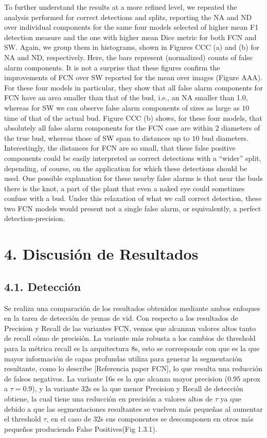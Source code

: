 \documentclass[a4paper,authoryear,review]{elsarticle}
\begin{document}
To further understand the results at a more refined level, we repeated the analysis performed for correct detections and splits, reporting the NA and ND over individual components for the same four models selected of higher mean F1 detection measure and the one with higher mean Dice metric for both FCN and SW. Again, we group them in histograms, shown in Figures CCC (a) and (b) for NA and ND, respectively. Here, the bars represent (normalized) counts of false alarm components. It is not a surprise that these figures confirm the improvements of FCN over SW reported for the mean over images (Figure AAA). For these four models in particular, they show that all false alarm components for FCN have an area smaller than that of the bud, i.e., an NA smaller than 1.0, whereas for SW we can observe false alarm components of sizes as large as $10$ time of that of the actual bud. Figure CCC (b) shows, for these four models, that absolutely all false alarm components for the FCN case are within $2$ diameters of the true bud, whereas those of SW span to distances up to $10$ bud diameters. Interestingly, the distances for FCN are so small, that these false positive components could be easily interpreted as correct detections with a “wider” split, depending, of course, on the application for which these detections should be used.   One possible explanation for these nearby false alarms is that near the buds there is the knot, a part of the plant that even a naked eye could sometimes confuse with a bud. Under this relaxation of what we call correct detection, these two FCN models would present not a single false alarm, or equivalently, a perfect detection-precision.

\section{4. Discusión de Resultados}
\label{discussion}

\subsection{4.1. Detección}
Se realiza una comparación de los resultados obtenidos mediante ambos enfoques en la tarea de detección de yemas de vid.
Con respecto a los resultados de Precision y Recall de las variantes FCN, vemos que alcanzan valores altos tanto de recall cómo de precisión. La variante más robusta a los cambios de threshold para la métrica recall es la arquitectura 8s, esto se corresponde con que es la que mayor información de capas profundas utiliza para generar la segmentación resultante, como lo describe [Referencia paper FCN], lo que resulta una reducción de falsos negativos. La variante 16s es la que alcanza mayor precision ($0.95$ aprox a $\tau=0.9$), y la variante 32s es la que menor Precision y Recall de detección obtiene, la cual tiene una reducción en precisión a valores altos de $\tau$ ya que debido a que las segmentaciones resultantes se vuelven más pequeñas al aumentar el threshold $\tau$, en el caso de 32s sus componentes se descomponen en otros más pequeños produciendo False Positives(Fig 1.3.1).
\end{document}
